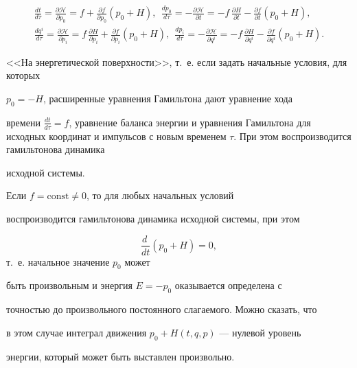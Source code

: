 \begin{eqnarray*}

\frac{dt}{d\tau}=\frac{\partial\mathcal{H}}{\partial p_0}

=f+\frac{\partial f}{\partial p_0}(p_0+H),~~

\frac{dp_0}{d\tau}=-\frac{\partial\mathcal{H}}{\partial t}

=-f\,\frac{\partial H}{\partial t}-\frac{\partial f}{\partial t}(p_0+H),\\

\frac{dq^i}{d\tau}=\frac{\partial\mathcal{H}}{\partial p_i}

=f\,\frac{\partial H}{\partial p_i}+\frac{\partial f}{\partial p_i}(p_0+H),~~

\frac{dp_i}{d\tau}=-\frac{\partial\mathcal{H}}{\partial q^i} =-f\,\frac{\partial

H}{\partial q^i}-\frac{\partial f}{\partial q^i}(p_0+H).

\end{eqnarray*}



<<На энергетической поверхности>>, т.~е. если задать начальные условия, для которых

 $p_0=-H$, расширенные уравнения Гамильтона дают уравнение хода

 времени $\frac{dt}{d\tau}=f$, уравнение баланса энергии и  уравнения Гамильтона для исходных координат и импульсов с новым  временем $\tau$. При этом воспроизводится гамильтонова динамика

 исходной системы.



 Если $f=\textrm{const}\not=0$, то для любых начальных условий

 воспроизводится гамильтонова динамика исходной системы, при этом

$$\frac{d~}{dt}(p_0+H)=0,$$ т.~е. начальное значение $p_0$ может

 быть произвольным и энергия $E=-p_0$ оказывается определена с

 точностью до произвольного постоянного слагаемого. Можно сказать, что

 в этом случае интеграл движения $p_0+H(t,q,p)$ --- нулевой уровень

 энергии, который может быть выставлен произвольно.




\smallskip



